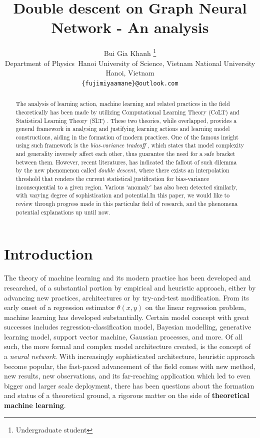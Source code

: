 \documentclass[10pt]{article} %
\title{Double descent on Graph Neural Network - An analysis}
\author{Bui Gia Khanh \thanks{Undergraduate student} \\
Department of Physics\
Hanoi University of Science, Vietnam National University\\
Hanoi, Vietnam\\
\texttt{\{fujimiyaamane\}@outlook.com} \\
}
\begin{document}
\maketitle

\begin{abstract}
       The analysis of learning action, machine learning and related practices in the field theoretically has been made by utilizing Computational Learning Theory (CoLT) \cite{10.1145/1968.1972} and Statistical Learning Theory (SLT) \cite{Vapnik1999-VAPTNO}. These two theories, while overlapped, provides a general framework in analysing and justifying learning actions and learning model constructions, aiding in the formation of modern practices. One of the famous insight using such framework is the \textit{bias-variance tradeoff} \cite{6797087}, which states that model complexity and generality inversely affect each other, thus guarantee the need for a safe bracket between them. However, recent literatures, \cite{belkin_reconciling_2019} has indicated the fallout of such dilemma by the new phenomenon called \textit{double descent}, where there exists an interpolation threshold that renders the current statistical justification for bias-variance inconsequential to a given region. Various `anomaly' has also been detected similarly, with varying degree of sophistication and potential.In this paper, we would like to review through progress made in this particular field of research, and the phenomena potential explanations up until now. 
\end{abstract}

\section{Introduction}

The theory of machine learning and its modern practice has been developed and researched, of a substantial portion by empirical and heuristic approach, either by advancing new practices, architectures or by try-and-test modification. From its early onset of a regression estimator $\theta(x,y)$ on the linear regression problem, machine learning has developed substantially. Certain model concept with great successes includes regression-classification model, Bayesian modelling, generative learning model, support vector machine, Gaussian processes, and more. Of all such, the more formal and complex model architecture created, is the concept of a \textit{neural network}. With increasingly sophisticated architecture, heuristic approach become popular, the fast-paced advancement of the field comes with new method, new results, new observations, and its far-reaching application which led to even bigger and larger scale deployment, there has been questions about the formation and status of a theoretical ground, a rigorous matter on the side of \textbf{theoretical machine learning}.
\end{document}
